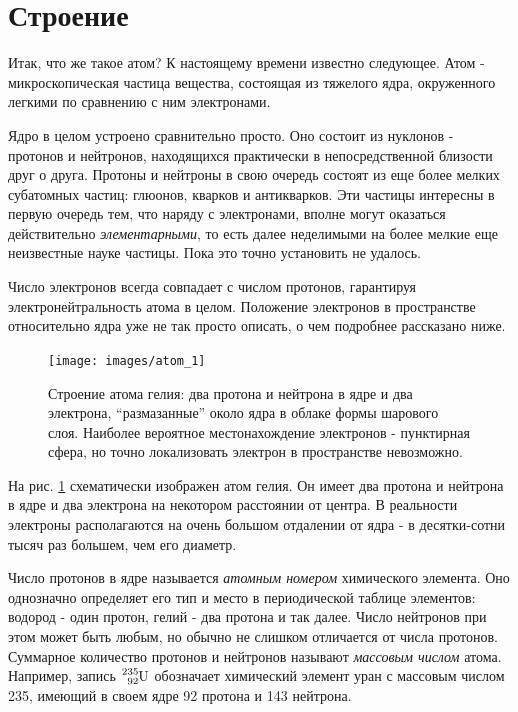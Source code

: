 \section*{Строение}

Итак, что же такое атом? К настоящему времени известно следующее.
Атом - микроскопическая частица вещества, состоящая из тяжелого ядра, окруженного легкими по сравнению с ним электронами.

Ядро в целом устроено сравнительно просто.
Оно состоит из нуклонов - протонов и нейтронов, находящихся практически в непосредственной близости друг о друга.
Протоны и нейтроны в свою очередь состоят из еще более мелких субатомных частиц: глюонов, кварков и антикварков.
Эти частицы интересны в первую очередь тем, что наряду с электронами, вполне могут оказаться действительно \textit{элементарными}, то есть далее неделимыми на более мелкие еще неизвестные науке частицы.
Пока это точно установить не удалось.

Число электронов всегда совпадает с числом протонов, гарантируя электронейтральность атома в целом.
Положение электронов в пространстве относительно ядра уже не так просто описать, о чем подробнее рассказано ниже.

\begin{figure}[t!]
   \centering
   \texttt{[image: images/atom\_1]}
   \caption{Строение атома гелия: два протона и нейтрона в ядре и два электрона, ``размазанные'' около ядра в облаке формы шарового слоя. Наиболее вероятное местонахождение электронов - пунктирная сфера, но точно локализовать электрон в пространстве невозможно.}
   \label{fig:atom_1}
\end{figure}

На рис. \ref{fig:atom_1} схематически изображен атом гелия.
Он имеет два протона и нейтрона в ядре и два электрона на некотором расстоянии от центра.
В реальности электроны располагаются на очень большом отдалении от ядра - в десятки-сотни тысяч раз большем, чем его диаметр.

Число протонов в ядре называется \textit{атомным номером} химического элемента.
Оно однозначно определяет его тип и место в периодической таблице элементов: водород - один протон, гелий - два протона и так далее.
Число нейтронов при этом может быть любым, но обычно не слишком отличается от числа протонов.
Суммарное количество протонов и нейтронов называют \textit{массовым числом} атома.
Например, запись $\ce{^{235}_{92}U}$ обозначает химический элемент уран с массовым числом 235, имеющий в своем ядре 92 протона и 143 нейтрона.

